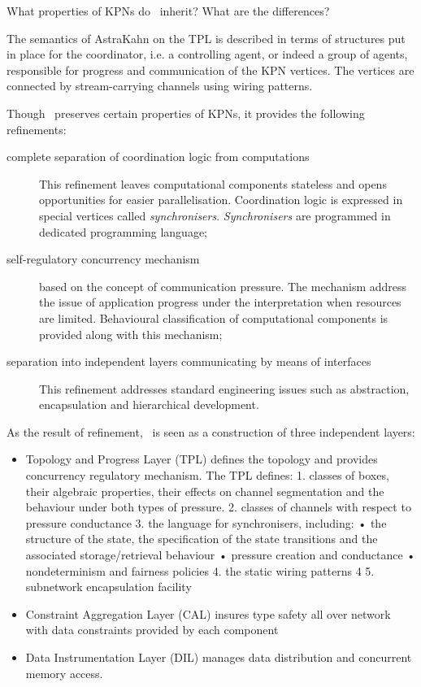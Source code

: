 What properties of KPNs do \ak\ inherit? What are the differences?


The semantics of AstraKahn on the TPL is described in terms of structures put in place for the coordinator, i.e. a controlling agent, or indeed a group of agents, responsible for progress and communication of the KPN vertices. The vertices are connected by stream-carrying channels using wiring patterns.


Though \ak\ preserves certain properties of KPNs, it provides the following refinements:
\begin{description}
\item[complete separation of coordination logic from computations]

This refinement leaves computational components stateless and opens opportunities for easier parallelisation. Coordination logic is expressed in special vertices called \emph{synchronisers}. \emph{Synchronisers} are programmed in dedicated programming language;
\item[self-regulatory concurrency mechanism] based on the concept of communication pressure. The mechanism address the issue of application progress under the interpretation when resources are limited. Behavioural classification of computational components is provided along with this mechanism;
\item[separation into independent layers communicating by means of interfaces]

This refinement addresses standard engineering issues such as abstraction, encapsulation and hierarchical development.
\end{description}

As the result of refinement, \ak\ is seen as a construction of three independent layers:
\begin{itemize}
\item Topology and Progress Layer (TPL) defines the topology and provides concurrency regulatory mechanism.
The TPL defines:
1. classes of boxes, their algebraic properties, their effects on channel segmentation and the behaviour under both types of pressure.
2. classes of channels with respect to pressure conductance 3. the language for synchronisers, including:
• the structure of the state, the specification of the state transitions and the associated storage/retrieval behaviour
• pressure creation and conductance • nondeterminism and fairness policies
4. the static wiring patterns 4
5. subnetwork encapsulation facility

\item Constraint Aggregation Layer (CAL) insures type safety all over network with data constraints provided by each component

\item Data Instrumentation Layer (DIL) manages data distribution and concurrent memory access.
\end{itemize}




